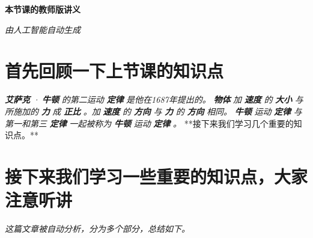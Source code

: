 \documentclass{article}%
\begin{document}
%
\normalsize%
\pagestyle{header}%
\begin{minipage}{\textwidth}%
\centering%
\begin{Large}%
\textbf{本节课的教师版讲义}%
\end{Large}%
\linebreak%
\begin{large}%
\textit{由人工智能自动生成}%
\end{large}%
\end{minipage}%
\section{首先回顾一下上节课的知识点}%
\label{sec:}%
\textit{}%
\textbf{\textit{艾萨克}}%
\textit{·}%
\textbf{\textit{牛顿}}%
\textit{的第二运动}%
\textbf{\textit{定律}}%
\textit{是他在1687年提出的。}%
\textbf{\textit{物体}}%
\textit{加}%
\textbf{\textit{速度}}%
\textit{的}%
\textbf{\textit{大小}}%
\textit{与所施加的}%
\textbf{\textit{力}}%
\textit{成}%
\textbf{\textit{正比}}%
\textit{。加}%
\textbf{\textit{速度}}%
\textit{的}%
\textbf{\textit{方向}}%
\textit{与}%
\textbf{\textit{力}}%
\textit{的}%
\textbf{\textit{方向}}%
\textit{相同。}%
\textbf{\textit{牛顿}}%
\textit{运动}%
\textbf{\textit{定律}}%
\textit{与第一和第三}%
\textbf{\textit{定律}}%
\textit{一起被称为}%
\textbf{\textit{牛顿}}%
\textit{运动}%
\textbf{\textit{定律}}%
\textit{。}%
\newline%
%
**接下来我们学习几个重要的知识点。**

%
\section{接下来我们学习一些重要的知识点，大家注意听讲}%
\label{sec:}%
\textit{这篇文章被自动分析，分为多个部分，总结如下。\newline%
}
\end{document}
